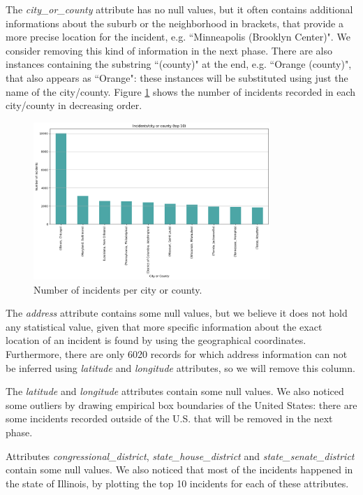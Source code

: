 \documentclass[10pt,a4paper]{report}
\begin{document}
The \textit{city\_or\_county} attribute has no null values, but it often contains additional informations about the suburb or the neighborhood in brackets, that provide a more precise location for the incident, e.g. ``Minneapolis (Brooklyn Center)".
We consider removing this kind of information in the next phase.
There are also instances containing the substring ``(county)" at the end, e.g. ``Orange (county)", that also appears as ``Orange": these instances will be substituted using just the name of the city/county.
Figure \ref{incidents_per_citycounty} shows the number of incidents recorded in each city/county in decreasing order.
\begin{figure}[H]
	\includegraphics[width=0.8\textwidth]{incidents_per_citycounty}
	\centering
	\caption{Number of incidents per city or county.}
	\label{incidents_per_citycounty}
\end{figure}

The \textit{address} attribute contains some null values, but we believe it does not hold any statistical value, given that more specific information about the exact location of an incident is found by using the geographical coordinates.
Furthermore, there are only 6020 records for which address information can not be inferred using \textit{latitude} and \textit{longitude} attributes, so we will remove this column.

The \textit{latitude} and \textit{longitude} attributes contain some null values.
We also noticed some outliers by drawing empirical box boundaries of the United States: there are some incidents recorded outside of the U.S. that will be removed in the next phase.

Attributes \textit{congressional\_district}, \textit{state\_house\_district} and \textit{state\_senate\_district} contain some null values.
We also noticed that most of the incidents happened in the state of Illinois, by plotting the top 10 incidents for each of these attributes.
\end{document}
